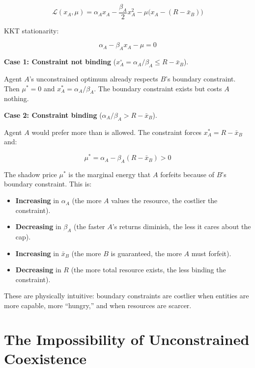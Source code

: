 \documentclass[11pt]{article}
\theoremstyle{plain}
\theoremstyle{definition}
\theoremstyle{remark}
\let\origsection\section
\renewcommand{\section}{\needspace{12\baselineskip}\origsection}
\providecommand{\tightlist}{%
  \setlength{\itemsep}{0pt}\setlength{\parskip}{0pt}}
\begin{document}
\[\mathcal{L}(x_A, \mu) = \alpha_A x_A - \frac{\beta_A}{2} x_A^2 - \mu\bigl(x_A - (R - \bar{x}_B)\bigr)\]

KKT stationarity:

\[\alpha_A - \beta_A x_A - \mu = 0\]

\textbf{Case 1: Constraint not binding}
(\(x_A^{\circ} = \alpha_A / \beta_A \leq R - \bar{x}_B\)).

Agent \(A\)'s unconstrained optimum already respects \(B\)'s boundary
constraint. Then \(\mu^* = 0\) and \(x_A^* = \alpha_A / \beta_A\). The
boundary constraint exists but costs \(A\) nothing.

\textbf{Case 2: Constraint binding}
(\(\alpha_A / \beta_A > R - \bar{x}_B\)).

Agent \(A\) would prefer more than is allowed. The constraint forces
\(x_A^* = R - \bar{x}_B\) and:

\[\mu^* = \alpha_A - \beta_A(R - \bar{x}_B) > 0\]

The shadow price \(\mu^*\) is the marginal energy that \(A\) forfeits
because of \(B\)'s boundary constraint. This is:

\begin{itemize}
\tightlist
\item
  \textbf{Increasing} in \(\alpha_A\) (the more \(A\) values the
  resource, the costlier the constraint).
\item
  \textbf{Decreasing} in \(\beta_A\) (the faster \(A\)'s returns
  diminish, the less it cares about the cap).
\item
  \textbf{Increasing} in \(\bar{x}_B\) (the more \(B\) is guaranteed,
  the more \(A\) must forfeit).
\item
  \textbf{Decreasing} in \(R\) (the more total resource exists, the less
  binding the constraint).
\end{itemize}

These are physically intuitive: boundary constraints are costlier when
entities are more capable, more ``hungry,'' and when resources are
scarcer.

\section{The Impossibility of Unconstrained
Coexistence}\label{the-impossibility-of-unconstrained-coexistence}
\end{document}
